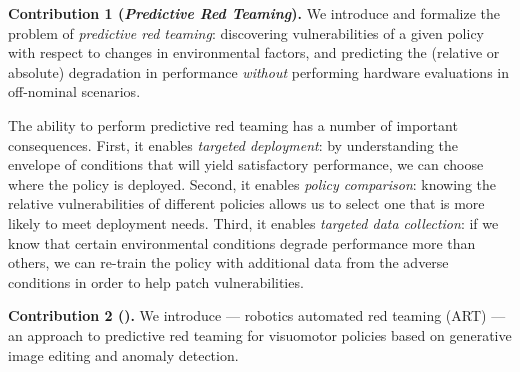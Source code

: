 
\vspace{2pt}
{\bf Contribution 1 (\emph{Predictive Red Teaming}).} We introduce and formalize the problem of \emph{predictive red teaming}: discovering vulnerabilities of a given policy with respect to changes in environmental factors, and predicting the (relative or absolute) degradation in performance \emph{without} performing hardware evaluations in off-nominal scenarios. 
\vspace{2pt}

The ability to perform predictive red teaming has a number of important consequences. First, it enables \emph{targeted deployment}: by understanding the envelope of conditions that will yield satisfactory performance, we can choose where the policy is deployed. Second, it enables \emph{policy comparison}: knowing the relative vulnerabilities of different policies allows us to select one that is more likely to meet deployment needs. Third, it enables \emph{targeted data collection}: if we know that certain environmental conditions degrade performance more than others, we can re-train the policy with additional data from the adverse conditions in order to help patch vulnerabilities. 

\vspace{2pt}
{\bf Contribution 2 (\redit).} We introduce \redit --- robotics automated red teaming (ART) --- an approach to predictive red teaming for visuomotor policies based on generative image editing and anomaly detection. 
\vspace{2pt}


